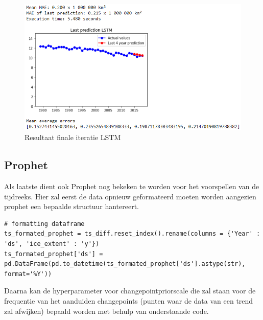 \begin{figure}
    \centering
    \caption{Resultaat finale iteratie LSTM}
    \label{fig:uvnslstm}
    \includegraphics[width=1\linewidth]{uv_ns_LSTM}
\end{figure}

\clearpage
\subsection{Prophet}

Als laatste dient ook Prophet nog bekeken te worden voor het voorspellen van de tijdreeks. Hier zal eerst de data opnieuw geformateerd moeten worden aangezien prophet een bepaalde structuur hantereert.

\begin{verbatim}
# formatting dataframe
ts_formated_prophet = ts_diff.reset_index().rename(columns = {'Year' : 'ds', 'ice_extent' : 'y'})
ts_formated_prophet['ds'] = pd.DataFrame(pd.to_datetime(ts_formated_prophet['ds'].astype(str), format='%Y'))
\end{verbatim}

Daarna kan de hyperparameter voor changepoint\textunderscore prior\textunderscore scale die zal staan voor de frequentie van het aanduiden changepoints (punten waar de data van een trend zal afwijken) bepaald worden met behulp van onderstaande code.

